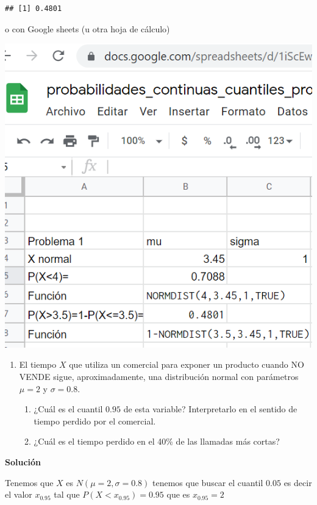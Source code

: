 \documentclass[
]{article}
\providecommand{\tightlist}{%
  \setlength{\itemsep}{0pt}\setlength{\parskip}{0pt}}
\begin{document}
\begin{verbatim}
## [1] 0.4801
\end{verbatim}

o con Google sheets (u otra hoja de cálculo)

\includegraphics[width=7.61in]{pro1_cont_1}

\newpage

\begin{enumerate}
\def\labelenumi{\arabic{enumi}.}
\setcounter{enumi}{1}
\tightlist
\item
  El tiempo \(X\) que utiliza un comercial para exponer un producto
  cuando NO VENDE sigue, aproximadamente, una distribución normal con
  parámetros \(\mu=2\) y \(\sigma=0.8\).

  \begin{enumerate}
  \def\labelenumii{\alph{enumii}.}
  \tightlist
  \item
    ¿Cuál es el cuantil \(0.95\) de esta variable? Interpretarlo en el
    sentido de tiempo perdido por el comercial.
  \item
    ¿Cuál es el tiempo perdido en el 40\% de las llamadas más cortas?
  \end{enumerate}
\end{enumerate}

\textbf{Solución}

Tenemos que \(X\) es \(N(\mu=2,\sigma=0.8)\) tenemos que buscar el
cuantil \(0.05\) es decir el valor \(x_{0.95}\) tal que
\(P(X <x_{0.95})=0.95\) que es \(x_{0.95}=2\)
\end{document}
